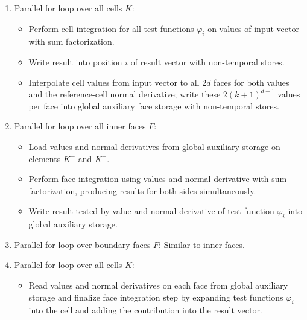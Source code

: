 \documentclass[a4paper,12pt]{article}
\begin{document}
\begin{enumerate}[label=\arabic*., leftmargin=2em, itemsep=0.8em]
    \item Parallel for loop over all cells $K$:
          \begin{itemize}[label=--, leftmargin=2em, itemsep=0.2em]
              \item Perform cell integration for all test functions $\varphi_i$ on values of input vector with sum factorization.
              \item Write result into position $i$ of result vector with non-temporal stores.
              \item Interpolate cell values from input vector to all $2d$ faces for both values and the reference-cell normal derivative; write these $2(k+1)^{d-1}$ values per face into global auxiliary face storage with non-temporal stores.
          \end{itemize}

    \item Parallel for loop over all inner faces $F$:
          \begin{itemize}[label=--, leftmargin=2em, itemsep=0.2em]
              \item Load values and normal derivatives from global auxiliary storage on elements $K^-$ and $K^+$.
              \item Perform face integration using values and normal derivative with sum factorization, producing results for both sides simultaneously.
              \item Write result tested by value and normal derivative of test function $\varphi_i$ into global auxiliary storage.
          \end{itemize}

    \item Parallel for loop over boundary faces $F$: Similar to inner faces.

    \item Parallel for loop over all cells $K$:
          \begin{itemize}[label=--, leftmargin=2em, itemsep=0.2em]
              \item Read values and normal derivatives on each face from global auxiliary storage and finalize face integration step by expanding test functions $\varphi_i$ into the cell and adding the contribution into the result vector.
          \end{itemize}
\end{enumerate}
\end{document}
